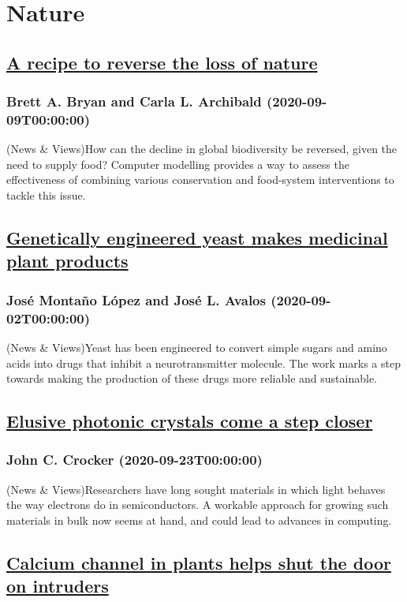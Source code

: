 \section{Nature}
\subsection*{\href{https://www.nature.com/articles/d41586-020-02502-2}{A recipe to reverse the loss of nature}}
\subsubsection*{Brett A. Bryan and Carla L. Archibald (2020-09-09T00:00:00)}
(News \& Views)How can the decline in global biodiversity be reversed, given the need to supply food? Computer modelling provides a way to assess the effectiveness of combining various conservation and food-system interventions to tackle this issue.
\subsection*{\href{https://www.nature.com/articles/d41586-020-02461-8}{Genetically engineered yeast makes medicinal plant products}}
\subsubsection*{José Montaño López and José L. Avalos (2020-09-02T00:00:00)}
(News \& Views)Yeast has been engineered to convert simple sugars and amino acids into drugs that inhibit a neurotransmitter molecule. The work marks a step towards making the production of these drugs more reliable and sustainable.
\subsection*{\href{https://www.nature.com/articles/d41586-020-02656-z}{Elusive photonic crystals come a step closer}}
\subsubsection*{John C.  Crocker (2020-09-23T00:00:00)}
(News \& Views)Researchers have long sought materials in which light behaves the way electrons do in semiconductors. A workable approach for growing such materials in bulk now seems at hand, and could lead to advances in computing.
\subsection*{\href{https://www.nature.com/articles/d41586-020-02504-0}{Calcium channel in plants helps shut the door on intruders}}
